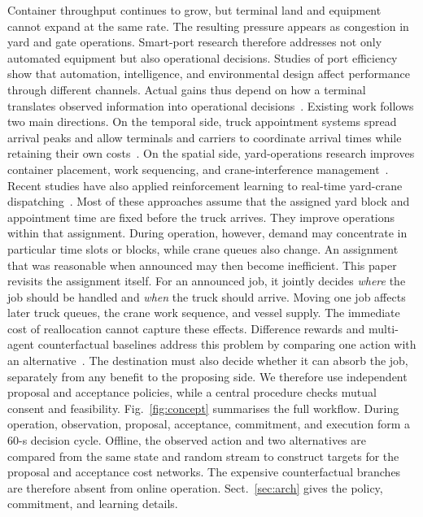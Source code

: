 \documentclass{llncs}
\begin{document}
Container throughput continues to grow, but terminal land and equipment
cannot expand at the same rate. The resulting pressure appears as
congestion in yard and gate operations. Smart-port research therefore
addresses not only automated equipment but also operational decisions.
Studies of port efficiency show that automation, intelligence, and
environmental design affect performance through different channels.
Actual gains thus depend on how a terminal translates observed
information into operational decisions~\cite{ref1}. Existing work follows two main
directions. On the temporal side, truck appointment systems spread
arrival peaks and allow terminals and carriers to coordinate arrival
times while retaining their own costs~\cite{ref4,ref6}. On the spatial
side, yard-operations research improves container placement, work
sequencing, and crane-interference management~\cite{ref7,ref8,ref9,ref16}.
Recent studies have also applied reinforcement learning to real-time
yard-crane dispatching~\cite{ref19}.
Most of these approaches assume that the assigned yard block and
appointment time are fixed before the truck arrives. They improve
operations within that assignment. During operation, however, demand
may concentrate in particular time slots or blocks, while crane queues
also change. An assignment that was reasonable when announced may then
become inefficient. This paper revisits the assignment itself. For an
announced job, it jointly decides \emph{where} the job should be handled
and \emph{when} the truck should arrive. Moving one job affects later
truck queues, the crane work sequence, and vessel supply. The immediate cost of reallocation cannot capture these effects. Difference rewards and
multi-agent counterfactual baselines address this problem by comparing
one action with an alternative~\cite{ref10,ref11}. The destination must
also decide whether it can absorb the job, separately from any benefit
to the proposing side. We therefore use independent proposal and
acceptance policies, while a central procedure checks mutual consent and
feasibility.
Fig.~\ref{fig:concept} summarises the full workflow. During operation,
observation, proposal, acceptance, commitment, and execution form a
60-s decision cycle. Offline, the observed action and two alternatives
are compared from the same state and random stream to construct targets
for the proposal and acceptance cost networks. The expensive
counterfactual branches are therefore absent from online operation.
Sect.~\ref{sec:arch} gives the policy, commitment, and learning details.
\end{document}
